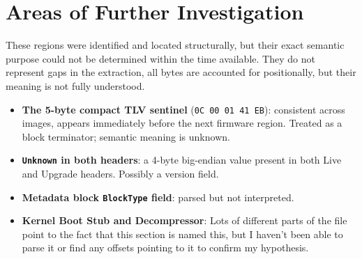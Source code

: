 \documentclass[11pt,a4paper]{article}
\begin{document}
\section{Areas of Further Investigation}

These regions were identified and located structurally, but their exact
semantic purpose could not be determined within the time available. They
do not represent gaps in the extraction, all bytes are accounted for
positionally, but their meaning is not fully understood.

\begin{itemize}
    \item \textbf{The 5-byte compact TLV sentinel}
          (\texttt{0C 00 01 41 EB}): consistent across images, appears
          immediately before the next firmware region. Treated as a block
          terminator; semantic meaning is unknown.

    \item \textbf{\texttt{Unknown} in both headers}: a 4-byte big-endian
          value present in both Live and Upgrade headers. Possibly a version
          field.

    \item \textbf{Metadata block \texttt{BlockType} field}: parsed but not
          interpreted.
          
    \item \textbf{Kernel Boot Stub and Decompressor}: Lots of different parts 
      	  of the file point to the fact that this section is named this, but 
          I haven't been able to parse it or find any offsets pointing to it 
          to confirm my hypothesis.
          
\end{itemize}
\end{document}
